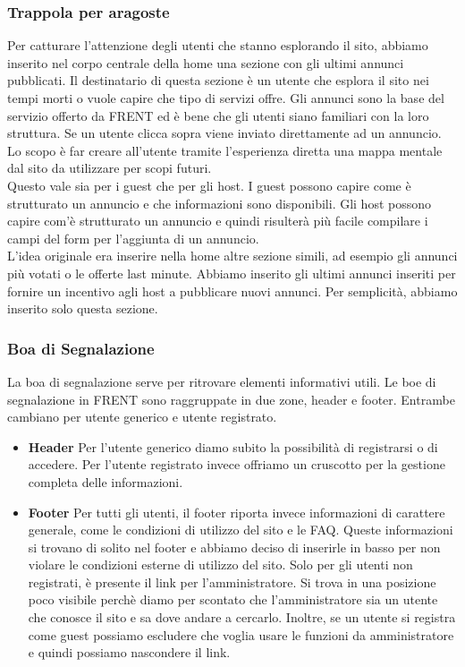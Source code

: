 \documentclass[1_relazione.tex]{subfiles}
\begin{document}
\subsubsection{Trappola per aragoste} 
Per catturare l'attenzione degli utenti che stanno esplorando il sito, abbiamo inserito nel corpo centrale della home una sezione con gli ultimi annunci pubblicati. Il destinatario di questa sezione è un utente che esplora il sito nei tempi morti o vuole capire che tipo di servizi offre. Gli annunci sono la base del servizio offerto da FRENT ed è bene che gli utenti siano familiari con la loro struttura. Se un utente clicca sopra viene inviato direttamente ad un annuncio. Lo scopo è far creare all'utente tramite l'esperienza diretta una mappa mentale dal sito da utilizzare per scopi futuri. \\
Questo vale sia per i guest che per gli host. I guest possono capire come è strutturato un annuncio e che informazioni sono disponibili. Gli host possono capire com'è strutturato un annuncio e quindi risulterà più facile compilare i campi del form per l'aggiunta di un annuncio. \\
L'idea originale era inserire nella home altre sezione simili, ad esempio gli annunci più votati o le offerte last minute. Abbiamo inserito gli ultimi annunci inseriti per fornire un incentivo agli host a pubblicare nuovi annunci. Per semplicità, abbiamo inserito solo questa sezione. \\

\subsubsection{Boa di Segnalazione}
La boa di segnalazione serve per ritrovare elementi informativi utili. Le boe di segnalazione in FRENT sono raggruppate in due zone, header e footer. Entrambe cambiano per utente generico e utente registrato.

\begin{itemize}
\item \textbf{Header}
Per l'utente generico diamo subito la possibilità di registrarsi o di accedere. Per l'utente registrato invece offriamo un cruscotto per la gestione completa delle informazioni. 
\item \textbf{Footer}
Per tutti gli utenti, il footer riporta invece informazioni di carattere generale, come le condizioni di utilizzo del sito e le FAQ. Queste informazioni si trovano di solito nel footer e abbiamo deciso di inserirle in basso per non violare le condizioni esterne di utilizzo del sito.  Solo per gli utenti non registrati, è presente il link per l'amministratore. Si trova in una posizione poco visibile perchè diamo per scontato che l'amministratore sia un utente che conosce il sito e sa dove andare a cercarlo. Inoltre, se un utente si registra come guest possiamo escludere che voglia usare le funzioni da amministratore e quindi possiamo nascondere il link. 
\end{itemize}
\end{document}
